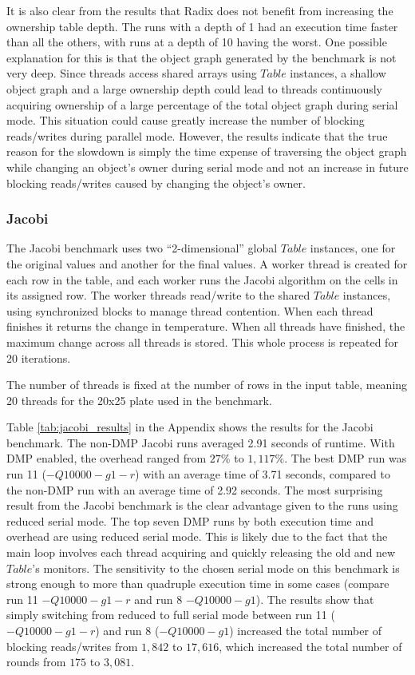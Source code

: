 It is also clear from the results that Radix does not benefit from
increasing the ownership table depth.  The runs with a depth of 1 had
an execution time faster than all the others, with runs at a depth of
10 having the worst.  One possible explanation for this is that the
object graph generated by the benchmark is not very deep.  Since
threads access shared arrays using $Table$ instances, a shallow object
graph and a large ownership depth could lead to threads continuously
acquiring ownership of a large percentage of the total object graph
during serial mode.  This situation could cause greatly increase the
number of blocking reads/writes during parallel mode.  However, the
results indicate that the true reason for the slowdown is simply the
time expense of traversing the object graph while changing an object's
owner during serial mode and not an increase in future blocking
reads/writes caused by changing the object's owner.

\subsubsection{Jacobi}

The Jacobi benchmark uses two ``2-dimensional'' global $Table$
instances, one for the original values and another for the final
values.  A worker thread is created for each row in the table, and
each worker runs the Jacobi algorithm on the cells in its assigned
row.  The worker threads read/write to the shared $Table$ instances,
using synchronized blocks to manage thread contention.  When each
thread finishes it returns the change in temperature.  When all
threads have finished, the maximum change across all threads is
stored.  This whole process is repeated for 20 iterations.

The number of threads is fixed at the number of rows in the input
table, meaning 20 threads for the 20x25 plate used in the benchmark.

Table \ref{tab:jacobi_results} in the Appendix shows the results for
the Jacobi benchmark.  The non-DMP Jacobi runs averaged 2.91 seconds
of runtime.  With DMP enabled, the overhead ranged from $27\%$ to
$1,117\%$.  The best DMP run was run 11 ($-Q10000 -g1 -r$) with an
average time of 3.71 seconds, compared to the non-DMP run with an
average time of 2.92 seconds.  The most surprising result from the
Jacobi benchmark is the clear advantage given to the runs using
reduced serial mode.  The top seven DMP runs by both execution time
and overhead are using reduced serial mode.  This is likely due to the
fact that the main loop involves each thread acquiring and quickly
releasing the old and new $Table$'s monitors.  The sensitivity to the
chosen serial mode on this benchmark is strong enough to more than
quadruple execution time in some cases (compare run 11 $-Q10000 -g1
-r$ and run 8 $-Q10000 -g1$).  The results show that simply switching
from reduced to full serial mode between run 11 ($-Q10000 -g1 -r$) and
run 8 ($-Q10000 -g1$) increased the total number of blocking
reads/writes from $1,842$ to $17,616$, which increased the total
number of rounds from $175$ to $3,081$.

